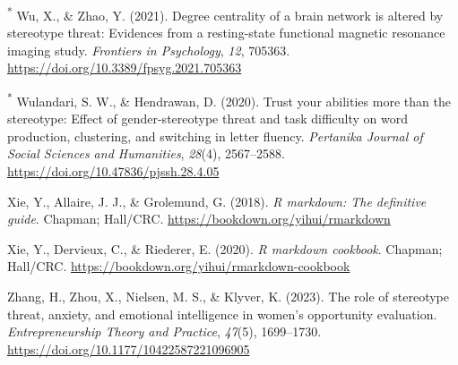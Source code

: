 \documentclass[
  stu, a4paper,floatsintext]{apa7}
\newlength{\cslhangindent}
\newenvironment{CSLReferences}[2] %
 {\begin{list}{}{%
  \setlength{\itemindent}{0pt}
  \setlength{\leftmargin}{0pt}
  \setlength{\parsep}{0pt}
  \ifodd #1
   \setlength{\leftmargin}{\cslhangindent}
   \setlength{\itemindent}{-1\cslhangindent}
  \fi
  \setlength{\itemsep}{#2\baselineskip}}}
 {\end{list}}
\begin{document}
\begin{CSLReferences}{1}{0}
\textsuperscript{*} Wu, X., \& Zhao, Y. (2021). Degree centrality of a brain network is altered by stereotype threat: {Evidences} from a resting-state functional magnetic resonance imaging study. \emph{Frontiers in Psychology}, \emph{12}, 705363. \url{https://doi.org/10.3389/fpsyg.2021.705363}

\textsuperscript{*} Wulandari, S. W., \& Hendrawan, D. (2020). Trust your abilities more than the stereotype: {Effect} of gender-stereotype threat and task difficulty on word production, clustering, and switching in letter fluency. \emph{Pertanika Journal of Social Sciences and Humanities}, \emph{28}(4), 2567--2588. \url{https://doi.org/10.47836/pjssh.28.4.05}

Xie, Y., Allaire, J. J., \& Grolemund, G. (2018). \emph{R markdown: The definitive guide}. Chapman; Hall/CRC. \url{https://bookdown.org/yihui/rmarkdown}

Xie, Y., Dervieux, C., \& Riederer, E. (2020). \emph{R markdown cookbook}. Chapman; Hall/CRC. \url{https://bookdown.org/yihui/rmarkdown-cookbook}

Zhang, H., Zhou, X., Nielsen, M. S., \& Klyver, K. (2023). The role of stereotype threat, anxiety, and emotional intelligence in women's opportunity evaluation. \emph{Entrepreneurship Theory and Practice}, \emph{47}(5), 1699--1730. \url{https://doi.org/10.1177/10422587221096905}

\end{CSLReferences}


\clearpage
\renewcommand{\listfigurename}{Figure captions}

\clearpage
\renewcommand{\listtablename}{Table captions}
\end{document}
